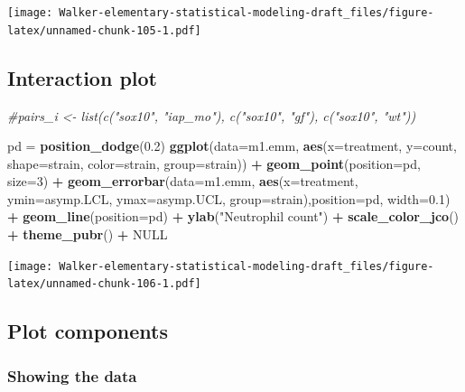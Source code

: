 \documentclass[]{book}
\newenvironment{Shaded}{\begin{snugshade}}{\end{snugshade}}
\newcommand{\CommentTok}[1]{\textcolor[rgb]{0.56,0.35,0.01}{\textit{#1}}}
\newcommand{\DataTypeTok}[1]{\textcolor[rgb]{0.13,0.29,0.53}{#1}}
\newcommand{\DecValTok}[1]{\textcolor[rgb]{0.00,0.00,0.81}{#1}}
\newcommand{\FloatTok}[1]{\textcolor[rgb]{0.00,0.00,0.81}{#1}}
\newcommand{\KeywordTok}[1]{\textcolor[rgb]{0.13,0.29,0.53}{\textbf{#1}}}
\newcommand{\NormalTok}[1]{#1}
\newcommand{\OperatorTok}[1]{\textcolor[rgb]{0.81,0.36,0.00}{\textbf{#1}}}
\newcommand{\OtherTok}[1]{\textcolor[rgb]{0.56,0.35,0.01}{#1}}
\newcommand{\StringTok}[1]{\textcolor[rgb]{0.31,0.60,0.02}{#1}}
\begin{document}
\texttt{[image: Walker-elementary-statistical-modeling-draft\_files/figure-latex/unnamed-chunk-105-1.pdf]}

\hypertarget{interaction-plot}{%
\subsection{Interaction plot}\label{interaction-plot}}

\begin{Shaded}
\begin{Highlighting}[]
\CommentTok{#pairs_i <- list(c("sox10", "iap_mo"), c("sox10", "gf"), c("sox10", "wt"))}

\NormalTok{pd =}\StringTok{ }\KeywordTok{position_dodge}\NormalTok{(}\FloatTok{0.2}\NormalTok{)}
\KeywordTok{ggplot}\NormalTok{(}\DataTypeTok{data=}\NormalTok{m1.emm, }\KeywordTok{aes}\NormalTok{(}\DataTypeTok{x=}\NormalTok{treatment, }\DataTypeTok{y=}\NormalTok{count, }\DataTypeTok{shape=}\NormalTok{strain, }\DataTypeTok{color=}\NormalTok{strain, }\DataTypeTok{group=}\NormalTok{strain)) }\OperatorTok{+}
\StringTok{  }\KeywordTok{geom_point}\NormalTok{(}\DataTypeTok{position=}\NormalTok{pd, }\DataTypeTok{size=}\DecValTok{3}\NormalTok{) }\OperatorTok{+}
\StringTok{  }\KeywordTok{geom_errorbar}\NormalTok{(}\DataTypeTok{data=}\NormalTok{m1.emm, }\KeywordTok{aes}\NormalTok{(}\DataTypeTok{x=}\NormalTok{treatment, }\DataTypeTok{ymin=}\NormalTok{asymp.LCL, }\DataTypeTok{ymax=}\NormalTok{asymp.UCL, }\DataTypeTok{group=}\NormalTok{strain),}\DataTypeTok{position=}\NormalTok{pd, }\DataTypeTok{width=}\FloatTok{0.1}\NormalTok{) }\OperatorTok{+}
\StringTok{  }\KeywordTok{geom_line}\NormalTok{(}\DataTypeTok{position=}\NormalTok{pd) }\OperatorTok{+}
\StringTok{  }\KeywordTok{ylab}\NormalTok{(}\StringTok{"Neutrophil count"}\NormalTok{) }\OperatorTok{+}
\StringTok{  }\KeywordTok{scale_color_jco}\NormalTok{() }\OperatorTok{+}
\StringTok{  }\KeywordTok{theme_pubr}\NormalTok{() }\OperatorTok{+}
\StringTok{  }\OtherTok{NULL}
\end{Highlighting}
\end{Shaded}

\texttt{[image: Walker-elementary-statistical-modeling-draft\_files/figure-latex/unnamed-chunk-106-1.pdf]}

\hypertarget{plot-components}{%
\subsection{Plot components}\label{plot-components}}

\hypertarget{showing-the-data}{%
\subsubsection{Showing the data}\label{showing-the-data}}
\end{document}
